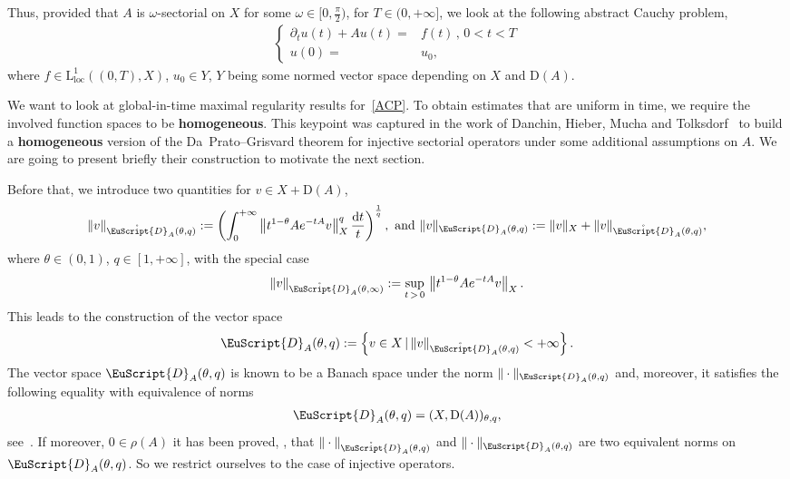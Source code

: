 \documentclass[10pt]{amsart}
\theoremstyle{definition}\newtheorem{defi}[theo]{Definition}\newtheorem{rema}[theo]{Remark}\newtheorem{exam}[theo]{Example}\newtheorem{exem}[theo]{Example}\newtheorem{nota}[theo]{Notation}
\newcommand{\rmd}{\mathrm{d}}
\newcommand{\rmD}{\mathrm{D}}
\newcommand{\rmL}{\mathrm{L}}
\newcommand{\locc}{\mathrm{loc}}
\newcommand{\rgeusD}{\mathring{\eus{D}}}
\newcommand{\eus}{\EuScript}
\begin{document}
Thus, provided that $A$ is $\omega$-sectorial on $X$ for some $\omega\in [0,\tfrac{\pi}{2})$, for $T\in(0,+\infty]$, we look at the following abstract Cauchy problem,
\begin{align}
\tag{ACP}\label{ACP}
\left\{
\begin{array}{rl}
\partial_t u(t) +Au(t) =& f(t) \,\text{, } 0<t<T\\
u(0) =& u_0\text{,}
\end{array}
\right.
\end{align}
where $f\in \rmL^1_{\locc}((0,T),X)$, $u_0 \in Y$, $Y$ being some normed vector space depending on $X$ and $\rmD(A)$.

We want to look at global-in-time maximal regularity results for~\eqref{ACP}. To obtain estimates that are uniform in time, we require the involved function spaces to be \textbf{homogeneous}. This keypoint was captured in the work of Danchin, Hieber, Mucha and Tolksdorf~\cite[Chapter~2]{DanchinHieberMuchaTolk2020} to build a \textbf{homogeneous} version of the Da~Prato--Grisvard theorem for injective sectorial operators under some additional assumptions on $A$. We are going to present briefly their construction to motivate the next section.

Before that, we introduce two quantities for $v\in X + \rmD(A)$,
\begin{align*}
\| v\|_{\rgeusD_{A}(\theta,q)}:= \left(\int_{0}^{+\infty} \left\| t^{1-\theta}Ae^{-tA} v \right\|_{X}^q \frac{\rmd t}{t}\right)^\frac{1}{q},\text{ and } \| v\|_{{\eus{D}}_{A}(\theta,q)}:= \| v \|_X + \| v\|_{\rgeusD_{A}(\theta,q)},
\end{align*}
where $\theta \in(0,1)$, $q\in[1,+\infty]$, with the special case
\begin{align*}
\| v\|_{\rgeusD_{A}(\theta,\infty)}:= \sup_{t\,>\,0}\,\left\| t^{1-\theta}Ae^{-tA} v\right\|_{X}.
\end{align*}
This leads to the construction of the vector space
\begin{align*}
{\eus{D}}_{A}(\theta,q):= \left\{ v\in X\,|\, \| v\|_{\rgeusD_{A}(\theta,q)}<+\infty \right\} .
\end{align*}
The vector space ${\eus{D}}_{A}(\theta,q)$ is known to be a Banach space under the norm $\| \cdot\|_{{\eus{D}}_{A}(\theta,q)}$ and, moreover, it satisfies the following equality with equivalence of norms
\begin{align}\label{eq:InterpolationXDomainAIntro}
{\eus{D}}_{A}(\theta,q) = (X,\rmD(A))_{\theta,q},
\end{align}
see~\cite[Theorem~6.2.9]{bookHaase2006}. If moreover, $0\in \rho(A)$ it has been proved, \cite[Corollary~6.5.5]{bookHaase2006}, that $\| \cdot\|_{\rgeusD_{A}(\theta,q)}$ and $\| \cdot\|_{{\eus{D}}_{A}(\theta,q)}$ are two equivalent norms on ${\eus{D}}_{A}(\theta,q)$. So we restrict ourselves to the case of injective operators.
\end{document}
